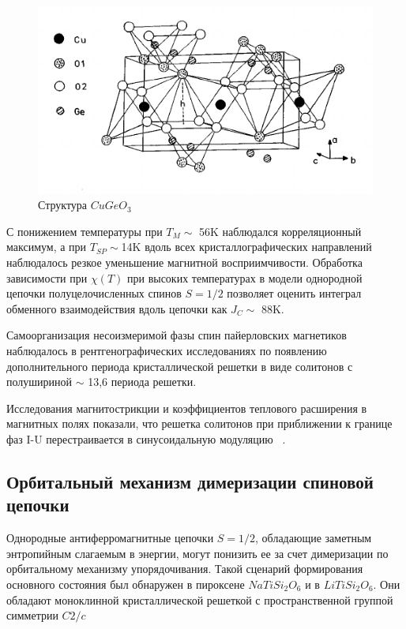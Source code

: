 \documentclass[11pt]{article}
\begin{document}
\begin{figure}[htp]
\centering
\includegraphics[scale=0.5]{CuGeO3}
\caption {Структура $CuGeO_3$  ~\cite{krishnamurthy1997}}
\label{}
\end{figure}

С понижением температуры при $T_M \sim $ 56K наблюдался корреляционный максимум, а при $T_{SP} \sim $14K вдоль всех кристаллографических направлений наблюдалось резкое уменьшение магнитной восприимчивости. Обработка зависимости при $\chi(T)$ при высоких температурах в модели однородной цепочки полуцелочисленных спинов $S=1/2$ позволяет оценить интеграл обменного взаимодействия вдоль цепочки как $J_C \sim $ 88K.

Самоорганизация несоизмеримой фазы спин пайерловских магнетиков наблюдалось в рентгенографических исследованиях по появлению дополнительного периода кристаллической решетки в виде солитонов с полушириной $\sim$ 13,6 периода решетки.

Исследования магнитострикции и коэффициентов теплового расширения в магнитных полях показали, что решетка солитонов при приближении к границе фаз I-U перестраивается в синусоидальную модуляцию ~\cite{lorenz1998}.

\subsection{Орбитальный механизм димеризации спиновой цепочки}
Однородные антиферромагнитные цепочки $S=1/2$, обладающие заметным энтропийным слагаемым в энергии, могут понизить ее за счет димеризации по орбитальному механизму упорядочивания. Такой сценарий формирования основного состояния был обнаружен в пироксене $NaTiSi_2O_6$ и в $LiTiSi_2O_6$. Они обладают моноклинной кристаллической решеткой с пространственной группой симметрии $C2/c$ ~\cite{nm}
\end{document}
